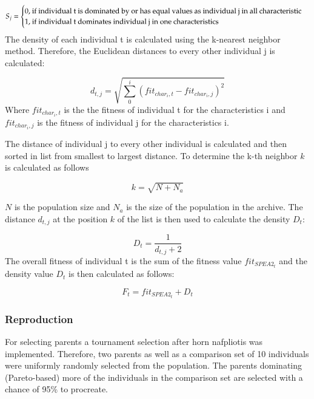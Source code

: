 \begin{onehalfspace}
\[
    S_j =
\begin{cases}
 0${, if individual t is dominated by or has equal values as individual j in all characteristic}$\\
  1${, if individual t dominates  individual j in one characteristics}$
\end{cases}
\]
The density of each individual t is calculated using the k-nearest neighbor method. Therefore, 
the  Euclidean distances to every other individual j is calculated: 

\begin{equation}
  d_{t,j} = \sqrt{\sum_{0}^{i}(fit_{char_i,t}-fit_{char_i,j})^2}
  \label{eq:distance}
\end{equation}
Where $fit_{char_i,t}$ is the the fitness of individual t for the characteristics i and  $fit_{char_i,j}$ is the fitness of individual j for the
characteristics i. 

The distance of individual j to every other individual is calculated and then sorted in
 list from smallest to largest distance. To determine the k-th neighbor $k$ is calculated as follows


 \begin{equation}
  k = \sqrt{N+ N_a}
  \label{eq:k}
\end{equation}

$N$ is the population size and $N_a$ is the size of the population in the archive.
The distance $d_{t,j}$ at the position $k$ of the list is then used to calculate the density $D_t$:

\begin{equation}
  D_t = \frac{1}{d_{t,j}+2}
  \label{eq:k}
\end{equation}
The overall fitness of individual t is the sum of the fitness value  $fit_{SPEA2_t}$ and the 
density value $D_t$ is then calculated as follows:


\begin{equation}
  F_t = fit_{SPEA2_t} + D_t
  \label{eq:k}
\end{equation}


 \subsubsection{Reproduction}


For selecting parents a tournament selection after horn nafpliotis was implemented. Therefore, two parents as well as a comparison set of 10 individuals were uniformly randomly selected from the population. The parents dominating (Pareto-based) more of the individuals in the comparison set are selected with a chance of 95\% to procreate. 


\end{onehalfspace}
